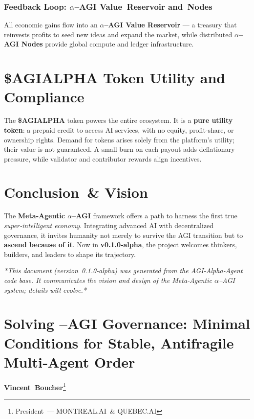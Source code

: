 \documentclass[12pt]{article}
\theoremstyle{plain}
\newcommand{\pdfmath}[2]{\texorpdfstring{$#1$}{#2}}
\newcommand{\AGIalpha}{\pdfmath{\alpha}{alpha}\nobreakdash--AGI\xspace}
\begin{document}
\subsubsection*{Feedback Loop: \AGIalpha Value Reservoir and Nodes}
All economic gains flow into an \textbf{\AGIalpha Value Reservoir} — a treasury
that reinvests profits to seed new ideas and expand the market, while
distributed \textbf{\AGIalpha Nodes} provide global compute and ledger
infrastructure.

\section{\$AGIALPHA Token Utility and Compliance}
The \textbf{\$AGIALPHA} token powers the entire ecosystem.  It is a
\textbf{pure utility token}: a prepaid credit to access AI services, with no
equity, profit‑share, or ownership rights.  Demand for tokens arises solely
from the platform’s utility; their value is not guaranteed.  A small burn on
each payout adds deflationary pressure, while validator and contributor
rewards align incentives.

\section{Conclusion \& Vision}
The \textbf{Meta‑Agentic \AGIalpha} framework offers a path to harness the
first true \textit{super‑intelligent economy}.  Integrating advanced AI with
decentralized governance, it invites humanity not merely to survive the AGI
transition but to \textbf{ascend because of it}.  Now in
\textbf{v0.1.0‑alpha}, the project welcomes thinkers, builders, and leaders to
shape its trajectory.

\bigskip
{\small\textit{*This document (version 0.1.0‑alpha) was generated from the
AGI‑Alpha‑Agent code base.  It communicates the vision and design of the
Meta‑Agentic \AGIalpha system; details will evolve.*}}

\clearpage
\appendix
\section{\texorpdfstring{Solving \bm{\alpha}--AGI Governance: Minimal Conditions for Stable, Antifragile Multi‑Agent Order}{Solving alpha‑AGI Governance}}
\textbf{Vincent Boucher}\footnote{President — \textsc{MONTREAL.AI} \& \textsc{QUEBEC.AI}}
\end{document}
